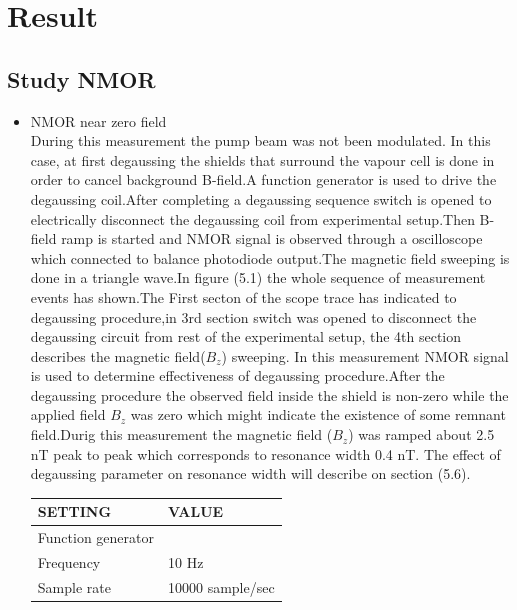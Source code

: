 \documentclass[12pt]{report}
\begin{document}
\chapter{Result}




\section{Study NMOR }
   \begin{itemize}
     \item NMOR near zero field \\
 During this measurement the pump beam was not been modulated. In this case,  at first degaussing the shields that surround the vapour cell is done in order to cancel background B-field.A function generator is used to drive the degaussing coil.After completing a degaussing sequence switch is opened to electrically disconnect the degaussing coil from experimental setup.Then B-field ramp is started and NMOR signal is observed through a oscilloscope which  connected to balance photodiode output.The magnetic field sweeping is done in a triangle wave.In figure (5.1) the whole sequence of measurement events has shown.The First secton of the scope trace has indicated to degaussing procedure,in 3rd section  switch was opened to disconnect the degaussing circuit from rest of the experimental setup, the 4th section describes the magnetic field($B_z$) sweeping. 
In this measurement NMOR signal is used to determine effectiveness of degaussing procedure.After the degaussing procedure the observed field inside the shield is non-zero while the applied field $B_z$ was zero which might indicate the existence of some remnant field.Durig this measurement the magnetic field ($B_z$) was ramped about 2.5 nT peak to peak which corresponds to resonance width 0.4 nT. The effect of degaussing parameter on resonance width will describe on section (5.6).
\begin{table}[h]
\centering
\begin{tabular}{|l |l|}
\hline

\textbf{ SETTING}    & \textbf{VALUE} \\
\hline
Function generator &   \\
\hline
Frequency & 10 Hz   \\

Sample rate    &  10000 sample/sec  \\


\end{tabular}
\end{table}
\end{itemize}
\end{document}
